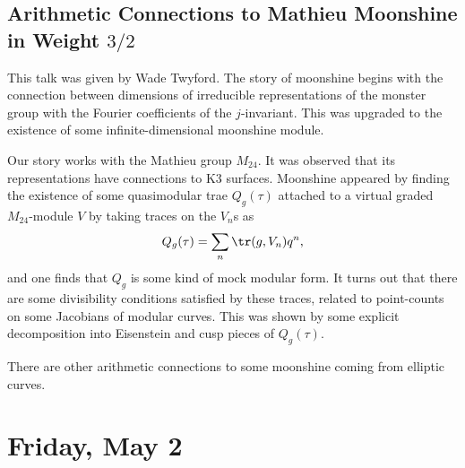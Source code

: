 \documentclass{article}
\begin{document}
\subsection{Arithmetic Connections to Mathieu Moonshine in Weight \texorpdfstring{$3/2$}{3/2}}
This talk was given by Wade Twyford. The story of moonshine begins with the connection between dimensions of irreducible representations of the monster group with the Fourier coefficients of the $j$-invariant. This was upgraded to the existence of some infinite-dimensional moonshine module.

Our story works with the Mathieu group $M_{24}$. It was observed that its representations have connections to K3 surfaces. Moonshine appeared by finding the existence of some quasimodular trae $Q_g(\tau)$ attached to a virtual graded $M_{24}$-module $V$ by taking traces on the $V_n$s as
\[Q_g(\tau)=\sum_n\tr(g,V_n)q^n,\]
and one finds that $Q_g$ is some kind of mock modular form. It turns out that there are some divisibility conditions satisfied by these traces, related to point-counts on some Jacobians of modular curves. This was shown by some explicit decomposition into Eisenstein and cusp pieces of $Q_g(\tau)$.
\begin{remark}
	There are other arithmetic connections to some moonshine coming from elliptic curves.
\end{remark}

\section{Friday, May 2}
\end{document}
